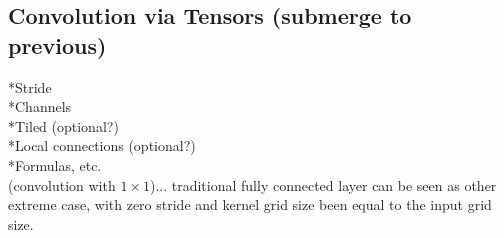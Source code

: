 \documentclass[]{article}
\begin{document}

\subsection{Convolution via Tensors (submerge to previous)}
*Stride\\
*Channels\\
*Tiled (optional?)\\
*Local connections (optional?)\\
*Formulas, etc.\\
(convolution with $1\times 1$)... traditional fully connected layer can be seen
as other extreme case, with zero stride and kernel grid size been equal to the
input grid size.

%
%
%
%
%
%
%
%
\end{document}
